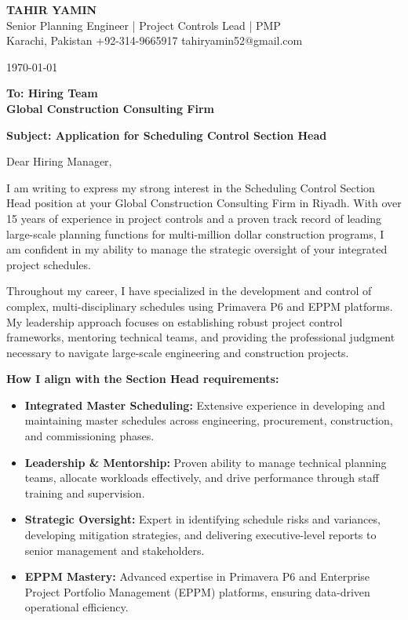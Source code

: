 \documentclass[11pt,a4paper]{article}
\begin{document}
\begin{center}
    {\Huge \textbf{\color{awesome-darknight} TAHIR YAMIN}} \\[0.2cm]
    {\Large \color{awesome-gray} Senior Planning Engineer | Project Controls Lead | PMP} \\[0.3cm]
    
    \small \color{light-gray}
    Karachi, Pakistan \quad \textbullet \quad 
    +92-314-9665917 \quad \textbullet \quad 
    tahiryamin52@gmail.com
\end{center}

\vspace{0.8cm}
\today
\vspace{0.5cm}

\textbf{To: Hiring Team} \\
\textbf{Global Construction Consulting Firm} \\
\vspace{0.5cm}

\textbf{Subject: Application for Scheduling Control Section Head}

\vspace{0.5cm}

Dear Hiring Manager,

I am writing to express my strong interest in the Scheduling Control Section Head position at your Global Construction Consulting Firm in Riyadh. With over 15 years of experience in project controls and a proven track record of leading large-scale planning functions for multi-million dollar construction programs, I am confident in my ability to manage the strategic oversight of your integrated project schedules.

Throughout my career, I have specialized in the development and control of complex, multi-disciplinary schedules using Primavera P6 and EPPM platforms. My leadership approach focuses on establishing robust project control frameworks, mentoring technical teams, and providing the professional judgment necessary to navigate large-scale engineering and construction projects.

\textbf{How I align with the Section Head requirements:}
\begin{itemize}
    \item \textbf{Integrated Master Scheduling:} Extensive experience in developing and maintaining master schedules across engineering, procurement, construction, and commissioning phases.
    \item \textbf{Leadership \& Mentorship:} Proven ability to manage technical planning teams, allocate workloads effectively, and drive performance through staff training and supervision.
    \item \textbf{Strategic Oversight:} Expert in identifying schedule risks and variances, developing mitigation strategies, and delivering executive-level reports to senior management and stakeholders.
    \item \textbf{EPPM Mastery:} Advanced expertise in Primavera P6 and Enterprise Project Portfolio Management (EPPM) platforms, ensuring data-driven operational efficiency.
\end{itemize}
\end{document}
